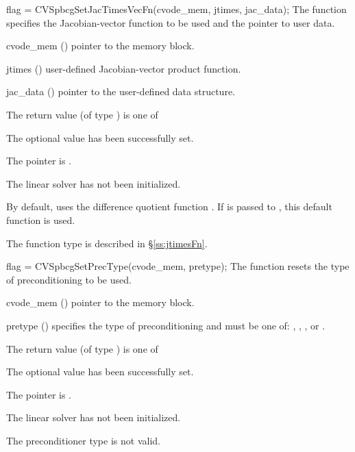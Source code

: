 {
  flag = CVSpbcgSetJacTimesVecFn(cvode\_mem, jtimes, jac\_data);
}
{
  The function  specifies the Jacobian-vector 
  function to be used and the pointer to user data.
}
{
  \begin{args}
  \item[cvode\_mem] ()
    pointer to the {\cvode} memory block.
  \item[jtimes] ()
    user-defined Jacobian-vector product function.
  \item[jac\_data] ()
     pointer to the user-defined data structure.
  \end{args}
}
{
  The return value  (of type ) is one of
  \begin{args}
  \item[\Id{CVSPBCG\_SUCCESS}] 
    The optional value has been successfully set.
  \item[\Id{CVSPBCG\_MEM\_NULL}]
    The  pointer is .
  \item[\Id{CVSPBCG\_LMEM\_NULL}]
    The {\cvspbcg} linear solver has not been initialized.
  \end{args}
}
{
  By default, {\cvspbcg} uses the difference quotient function .
  If  is passed to , this default function is used.

  The function type  is described in \S\ref{ss:jtimesFn}.
}
{
  flag = CVSpbcgSetPrecType(cvode\_mem, pretype);
}
{
  The function  resets the type
  of preconditioning to be used.
}
{
  \begin{args}
  \item[cvode\_mem] ()
    pointer to the {\cvode} memory block.
  \item[pretype] ()
    specifies the type of preconditioning and must be one of:
    , , , or .
  \end{args}
}
{
  The return value  (of type ) is one of
  \begin{args}
  \item[\Id{CVSPBCG\_SUCCESS}] 
    The optional value has been successfully set.
  \item[\Id{CVSPBCG\_MEM\_NULL}]
    The  pointer is .
  \item[\Id{CVSPBCG\_LMEM\_NULL}]
    The {\cvspbcg} linear solver has not been initialized.
  \item[\Id{CVSPBCG\_ILL\_INPUT}]
    The preconditioner type  is not valid.
  \end{args}
}
